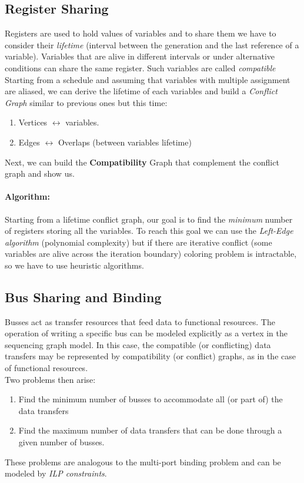 \subsection{Register Sharing}
Registers are used to hold values of variables and to share them we have to consider their \textit{lifetime} (interval between the generation and the last reference of a variable). Variables that are alive in different intervals or under alternative conditions can share the same register. Such variables are called \textit{compatible}
\bigskip\\
Starting from a schedule and assuming that variables with multiple assignment are aliased, we can derive the lifetime of each variables and build a \textit{Conflict Graph} similar to previous ones but this time: 
\begin{enumerate}
	\item Vertices $\longleftrightarrow$ variables.
	\item Edges $\longleftrightarrow$ Overlaps (between variables lifetime)
\end{enumerate}
Next, we can build the \textbf{Compatibility} Graph that complement the conflict graph and show us.
\paragraph{Algorithm: }
Starting from a lifetime conflict graph, our goal is to find the \textit{minimum} number of registers storing all the variables. To reach this goal we can use the \textit{Left-Edge algorithm} (polynomial complexity) but if there are iterative conflict (some variables are alive across the iteration boundary) coloring problem is intractable, so we have to use heuristic algorithms.
\subsection{Bus Sharing and Binding}
Busses act as transfer resources that feed data to functional resources. The operation of writing a specific bus can be modeled explicitly as a vertex in the sequencing graph model. In this case, the compatible (or conflicting) data transfers may be represented by compatibility (or conflict) graphs, as in the case of functional resources.
\bigskip\\
Two problems then arise:
\begin{enumerate}
	\item Find the minimum number of busses to accommodate all (or part of) the data transfers
	\item Find the maximum number of
	data transfers that can be done through a given number of busses.
\end{enumerate}
These problems are analogous to the multi-port binding problem and can be modeled by \textit{ILP constraints}.
